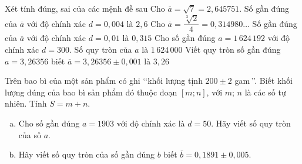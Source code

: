 \begin{ex}%
	Xét tính đúng, sai của các mệnh đề sau 
	\choiceTF 
		{Cho $\overline{a}=\sqrt{7}=2{,}645751$. Số gần đúng của $\overline{a}$ với độ  chính xác $d=0{,}004$ là $2{,}6$}
		{Cho $\overline{a}=\dfrac{\sqrt[3]{2}}{4}=0{,}314980\ldots$ Số gần đúng  của $\overline{a}$ với độ chính xác $d=0{,}01$ là $0{,}315$}
		{\True Cho số gần đúng  $a=1\,624\,192$ với độ chính xác $d=300$. Số quy tròn của $a$ là $1\,624\,000$}
		{\True Viết quy tròn số gần đúng $a=3{,}26356$ biết $\overline{a}=3{,}26356\pm 0{,}001$  là $3{,}26$}
\end{ex}



\begin{bt}%
	Trên bao bì của một sản phẩm có ghi \lq\lq khối lượng tịnh $200 \pm 2$ gam\,\rq\rq. Biết khối lượng đúng của bao bì sản phẩm đó  thuộc đoạn $[m; n]$, với $m$; $n$ là các số tự nhiên. Tính $S=m+n$.
\end{bt}

\begin{bt}[H]%
	\begin{enumerate}[a)]
		\item Cho số gần đúng $a=1903$ với độ chính xác là $d=50$. Hãy viết số quy tròn của số $a$.
		\item Hãy viết số quy tròn của số gần đúng $b$ biết $\overline{b}=0{,}1891 \pm 0{,}005$.
	\end{enumerate}
\end{bt}

